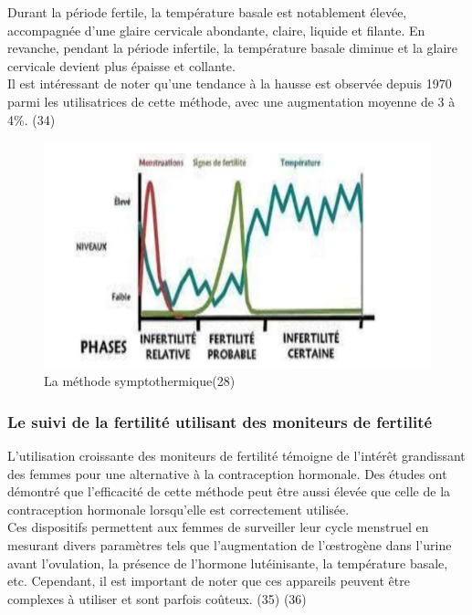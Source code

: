 \noindent Durant la période fertile, la température basale est notablement élevée, accompagnée d'une glaire cervicale abondante, claire, liquide et filante. En revanche, pendant la période infertile, la température basale diminue et la glaire cervicale devient plus épaisse et collante.\\

\noindent Il est intéressant de noter qu'une tendance à la hausse est observée depuis 1970 parmi les utilisatrices de cette méthode, avec une augmentation moyenne de 3 à 4\%. (34)\\ 

\begin{figure}[H]
  \centering
  \includegraphics[scale=.3]{Images/fig_16.jpg}
  \caption{La méthode symptothermique(28)}
\end{figure}

\subsubsection{Le suivi de la fertilité utilisant des moniteurs de fertilité}
L'utilisation croissante des moniteurs de fertilité témoigne de l'intérêt grandissant des femmes pour une alternative à la contraception hormonale. Des études ont démontré que l’efficacité de cette méthode peut être aussi élevée que celle de la contraception hormonale lorsqu’elle est correctement utilisée. \\

\noindent Ces dispositifs permettent aux femmes de surveiller leur cycle menstruel en mesurant divers paramètres tels que l'augmentation de l'œstrogène dans l'urine avant l'ovulation, la présence de l'hormone lutéinisante, la température basale, etc. Cependant, il est important de noter que ces appareils peuvent être complexes à utiliser et sont parfois coûteux. (35) (36)   \\

